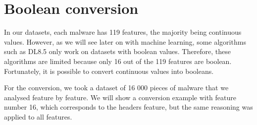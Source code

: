 \section{Boolean conversion} \label{boolean_conv}
In our datasets, each malware has 119 features, the majority being continuous values. However, as we will see later on with machine learning, some algorithms such as DL8.5 only work on datasets with boolean values. Therefore, these algorithms are limited because only 16 out of the 119 features are boolean. Fortunately, it is possible to convert continuous values into booleans.

For the conversion, we took a dataset of 16 000 pieces of malware that we analysed feature by feature. We will show a conversion example with feature number 16, which corresponds to the headers feature, but the same reasoning was applied to all features. 

